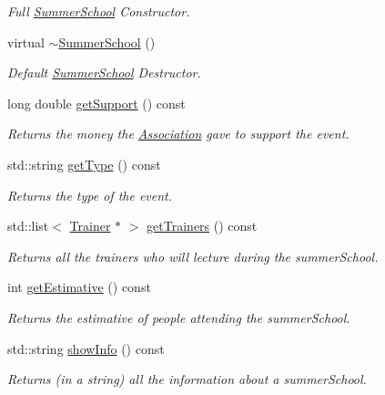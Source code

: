 \begin{DoxyCompactItemize}
\begin{DoxyCompactList}\small\item\em Full \mbox{\hyperlink{classSummerSchool}{Summer\+School}} Constructor. \end{DoxyCompactList}\item 
virtual \mbox{\hyperlink{classSummerSchool_ad3c3df760cfaee1042fe5290fa487b2c}{$\sim$\+Summer\+School}} ()
\begin{DoxyCompactList}\small\item\em Default \mbox{\hyperlink{classSummerSchool}{Summer\+School}} Destructor. \end{DoxyCompactList}\item 
long double \mbox{\hyperlink{classSummerSchool_a86f34a2f39dcd33171e77c386165219c}{get\+Support}} () const
\begin{DoxyCompactList}\small\item\em Returns the money the \mbox{\hyperlink{classAssociation}{Association}} gave to support the event. \end{DoxyCompactList}\item 
std\+::string \mbox{\hyperlink{classSummerSchool_a2ba547411ca8f161c2c579f9f55f913e}{get\+Type}} () const
\begin{DoxyCompactList}\small\item\em Returns the type of the event. \end{DoxyCompactList}\item 
std\+::list$<$ \mbox{\hyperlink{classTrainer}{Trainer}} $\ast$ $>$ \mbox{\hyperlink{classSummerSchool_aba18410ee9fbafd26858232104b5b39f}{get\+Trainers}} () const
\begin{DoxyCompactList}\small\item\em Returns all the trainers who will lecture during the summer\+School. \end{DoxyCompactList}\item 
int \mbox{\hyperlink{classSummerSchool_a019b9e38108b7dd31cd93cab285d0d00}{get\+Estimative}} () const
\begin{DoxyCompactList}\small\item\em Returns the estimative of people attending the summer\+School. \end{DoxyCompactList}\item 
std\+::string \mbox{\hyperlink{classSummerSchool_a61ac7307840f787e3de639d431248e26}{show\+Info}} () const
\begin{DoxyCompactList}\small\item\em Returns (in a string) all the information about a summer\+School. \end{DoxyCompactList}\end{DoxyCompactItemize}
